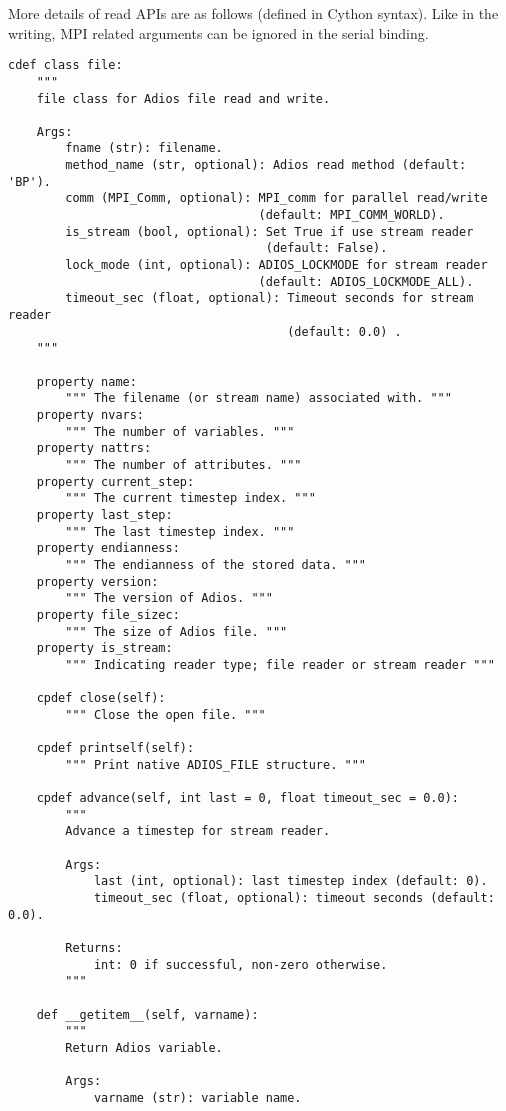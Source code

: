 More details of read APIs are as follows (defined in Cython syntax). Like in the writing, MPI related arguments can be ignored in the serial binding.
\begin{lstlisting}[language=cython,caption={Read functions},label={},]
cdef class file:
    """
    file class for Adios file read and write.

    Args:
        fname (str): filename.
        method_name (str, optional): Adios read method (default: 'BP').
        comm (MPI_Comm, optional): MPI_comm for parallel read/write 
                                   (default: MPI_COMM_WORLD).
        is_stream (bool, optional): Set True if use stream reader 
                                    (default: False).
        lock_mode (int, optional): ADIOS_LOCKMODE for stream reader 
                                   (default: ADIOS_LOCKMODE_ALL).
        timeout_sec (float, optional): Timeout seconds for stream reader
                                       (default: 0.0) .
    """

    property name:
        """ The filename (or stream name) associated with. """
    property nvars:
        """ The number of variables. """
    property nattrs:
        """ The number of attributes. """
    property current_step:
        """ The current timestep index. """
    property last_step:
        """ The last timestep index. """
    property endianness:
        """ The endianness of the stored data. """
    property version:
        """ The version of Adios. """
    property file_sizec:
        """ The size of Adios file. """
    property is_stream:
        """ Indicating reader type; file reader or stream reader """

    cpdef close(self):
        """ Close the open file. """
        
    cpdef printself(self):
        """ Print native ADIOS_FILE structure. """

    cpdef advance(self, int last = 0, float timeout_sec = 0.0):
        """
        Advance a timestep for stream reader.

        Args:
            last (int, optional): last timestep index (default: 0).
            timeout_sec (float, optional): timeout seconds (default: 0.0).

        Returns:
            int: 0 if successful, non-zero otherwise.
        """
        
    def __getitem__(self, varname):
        """
        Return Adios variable.

        Args:
            varname (str): variable name.


\end{lstlisting}
